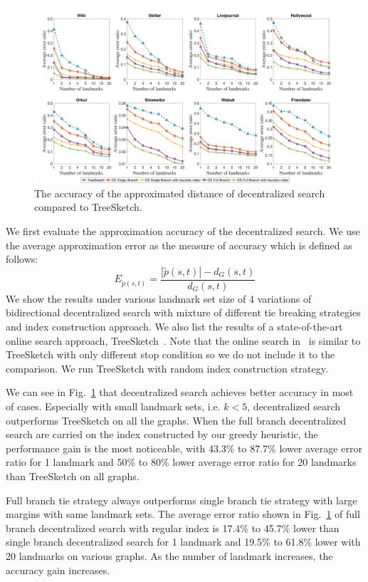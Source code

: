 \begin{figure}[ht]
    \centering
    \includegraphics[width=\linewidth]{./figures/accuracy_stepy.pdf}
    \caption{The accuracy of the approximated distance of decentralized search compared to TreeSketch.}
    \label{fig:accuracy_stepy}
\end{figure}

We first evaluate the approximation accuracy of the decentralized search. We use the average approximation error as the measure of accuracy which is defined as follows:
\[
E_{\tilde{p}(s,t)} = \frac{|\tilde{p}(s,t)| - d_G(s,t)}{d_G(s,t)}
\]
We show the results under various landmark set size of 4 variations of bidirectional decentralized search with mixture of different tie breaking strategies and index construction approach. We also list the results of a state-of-the-art online search approach, TreeSketch~\cite{Gubichev:2010:FAE:1871437.1871503}. Note that the online search in~\cite{6399472} is similar to TreeSketch with only different stop condition so we do not include it to the comparison. We run TreeSketch with random index construction strategy.

We can see in Fig.~\ref{fig:accuracy_stepy} that decentralized search achieves better accuracy in most of cases. Especially with small landmark sets, i.e. $k < 5$, decentralized search outperforms TreeSketch on all the graphs. When the full branch decentralized search are carried on the index constructed by our greedy heuristic, the performance gain is the most noticeable, with 43.3\% to 87.7\% lower average error ratio for 1 landmark and 50\% to 80\% lower average error ratio for 20 landmarks than TreeSketch on all graphs.

Full branch tie strategy always outperforms single branch tie strategy with large margins with same landmark sets. The average error ratio shown in Fig.~\ref{fig:accuracy_stepy} of full branch decentralized search with regular index is 17.4\% to 45.7\% lower than single branch decentralized search for 1 landmark and 19.5\% to 61.8\% lower with 20 landmarks on various graphs. As the number of landmark increases, the accuracy gain increases.   

